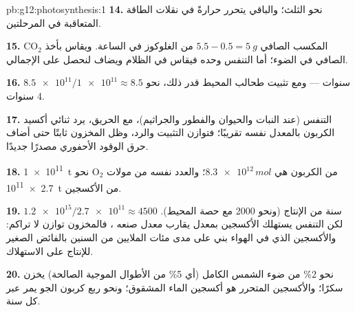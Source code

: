 \begin{solution}{pb:g12:photosynthesis:1}
\textbf{14.} نحو الثلث؛ والباقي يتحرر حرارةً في نقلات الطاقة المتعاقبة
في المرحلتين.

\textbf{15.} المكسب الصافي $5.5 - 0.5 = \qty{5}{g}$ من الغلوكوز في
الساعة. ويقاس بأخذ $\mathrm{CO_2}$ الصافي في الضوء؛ أما التنفس وحده
فيقاس في الظلام ويضاف لنحصل على  الإجمالي.

\textbf{16.} $\num{8.5e11}/\num{1e11} \approx 8.5$ سنوات --- ومع
تثبيت طحالب المحيط قدر ذلك، نحو 4 سنوات.

\textbf{17.} التنفس (عند النبات والحيوان والفطور والجراثيم)، مع
الحريق، يرد ثنائي أكسيد الكربون بالمعدل نفسه تقريبًا؛ فتوازن التثبيت
والرد، وظل المخزون ثابتًا حتى أضاف حرق الوقود الأحفوري مصدرًا جديدًا.

\textbf{18.} \qty{1e11}{t} من الكربون هي $\num{8.3e12}\,\unit{mol}$؛
والعدد نفسه من مولات $\mathrm{O_2}$ نحو \qty{2.7e11}{t} من
الأكسجين.

\textbf{19.} $\num{1.2e15}/\num{2.7e11} \approx 4500$ سنة من الإنتاج
(ونحو 2000 مع حصة المحيط). لكن التنفس يستهلك الأكسجين بمعدل يقارب
معدل صنعه ، فالمخزون توازن لا تراكم: والأكسجين الذي في
الهواء بني على مدى مئات الملايين من السنين بالفائض الصغير للإنتاج على
الاستهلاك.

\textbf{20.} نحو 2\% من ضوء الشمس الكامل (أي 5\% من الأطوال الموجية
الصالحة) يخزن سكرًا؛ والأكسجين المتحرر هو أكسجين الماء المشقوق؛ ونحو
ربع كربون الجو يمر عبر  كل سنة.
\end{solution}
